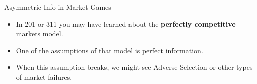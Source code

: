 
\begin{frame}{Asymmetric Info in Market Games}
  \begin{itemize}
    \item 
    In 201 or 311 you may have learned about the 
    \textbf{perfectly competitive} markets model. \\
    \item 
    One of the assumptions of that model is \alert{perfect information}. \\ 
    \item 
    When this assumption breaks, we might see \alert{Adverse Selection}
    or other types of market failures.
\end{itemize}
\end{frame}
